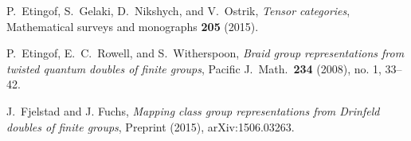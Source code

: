 \documentclass{amsart}
\begin{document}
\begin{thebibliography}{9999}

 P.\ Etingof, S.\ Gelaki, D.\ Nikshych,  and V.\ Ostrik, \emph{Tensor categories}, Mathematical surveys and monographs \textbf{205} (2015).

 P.\ Etingof, E.\ C.\ Rowell, and S.\ Witherspoon, \emph{Braid group representations from twisted quantum doubles of finite groups}, Pacific J.\ Math.\ \textbf{234} (2008), no. 1, 33--42.

 J.\ Fjelstad and J. Fuchs, \emph{Mapping class group representations from {Drinfeld} doubles of finite groups}, Preprint (2015), arXiv:1506.03263.










\end{thebibliography}
\end{document}
